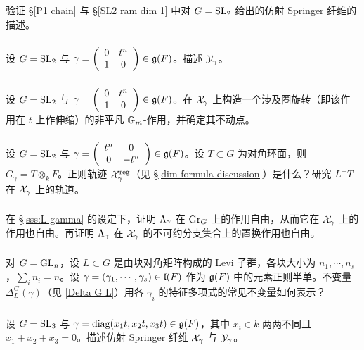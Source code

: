 \subsubsection{}\label{exII:SL2} 验证 \S\ref{P1 chain} 与 \S\ref{SL2 ram dim 1} 中对 $G=\textup{SL}_{2}$ 给出的仿射 Springer 纤维的描述。

\subsubsection{} 设 $G=\textup{SL}_{2}$ 与 $\gamma=\left(\begin{array}{cc} 0 & t^{n} \\ 1 & 0 \end{array}\right)\in\mathfrak{g}(F)$。描述 $\mathcal{Y}_{\gamma}$。

\subsubsection{} 设 $G=\textup{SL}_{2}$ 与 $\gamma=\left(\begin{array}{cc} 0 & t^{n} \\ 1 & 0 \end{array}\right)\in\mathfrak{g}(F)$。在 $\mathcal{X}_{\gamma}$ 上构造一个涉及圈旋转（即该作用在 $t$ 上作伸缩）的非平凡 $\mathbb{G}_m$-作用，并确定其不动点。

\subsubsection{} 设 $G=\textup{SL}_{2}$ 与 $\gamma=\left(\begin{array}{cc} t^{n} & 0 \\ 0 & -t^{n} \end{array}\right)\in\mathfrak{g}(F)$。设 $T\subset G$ 为对角环面，则 $G_{\gamma}=T\otimes_{k}F$。正则轨迹 $\mathcal{X}^{\textup{reg}}_{\gamma}$（见 \S\ref{dim formula discussion}）是什么？研究 $L^+T$ 在 $\mathcal{X}_{\gamma}$ 上的轨道。

\subsubsection{} 在 \S\ref{sss:L gamma} 的设定下，证明 $\Lambda_{\gamma}$ 在 $\textup{Gr}_{G}$ 上的作用自由，从而它在 $\mathcal{X}_{\gamma}$ 上的作用也自由。再证明 $\Lambda_{\gamma}$ 在 $\mathcal{X}_{\gamma}$ 的不可约分支集合上的置换作用也自由。

\subsubsection{} 对 $G=\textup{GL}_{n}$，设 $L\subset G$ 是由块对角矩阵构成的 Levi 子群，各块大小为 $n_{1},\cdots, n_{s}$，$\sum_{i}n_{i}=n$。设 $\gamma=(\gamma_{1},\cdots,\gamma_{s})\in\mathfrak{l}(F)$ 作为 $\mathfrak{g}(F)$ 中的元素正则半单。不变量 $\Delta^{G}_{L}(\gamma)$（见 \eqref{Delta G L}）用各 $\gamma_{i}$ 的特征多项式的常见不变量如何表示？

\subsubsection{}\label{exII:SL3} 设 $G=\textup{SL}_{3}$ 与 $\gamma=\textup{diag}(x_{1}t,x_{2}t,x_{3}t)\in\mathfrak{g}(F)$，其中 $x_{i}\in k$ 两两不同且 $x_{1}+x_{2}+x_{3}=0$。描述仿射 Springer 纤维 $\mathcal{X}_{\gamma}$ 与 $\mathcal{Y}_{\gamma}$。

